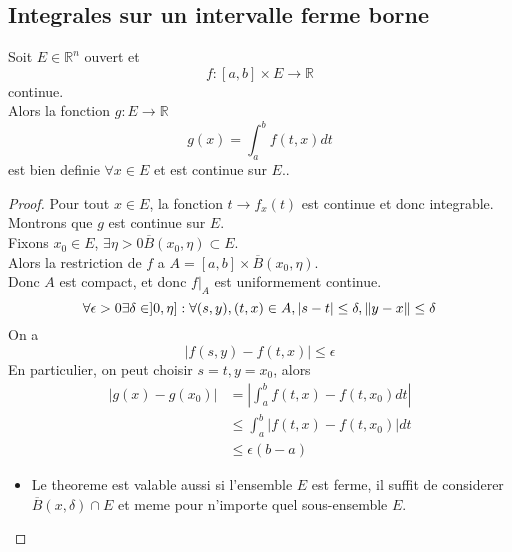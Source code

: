 \documentclass[../main.tex]{subfiles}
\begin{document}
\subsection{Integrales sur un intervalle ferme borne}
\begin{thm}
	Soit $E\in \mathbb{R}^n$ ouvert et 
	\[ 
		f:[a,b]\times E \to \mathbb{R}
	\]
continue.\\
Alors la fonction $g:E \to \mathbb{R}$ 
\[ 
	g( x) = \int_{ a }^{ b }f( t,x) dt
\]
est bien definie $\forall x \in E$ et est continue sur $E.$.\\
\end{thm}
\begin{proof}
	Pour tout $x\in E$, la fonction $t\to f_x( t) $ est continue et donc integrable.\\
	Montrons que $g$ est continue sur $E$.\\
	Fixons $x_0\in E$, $\exists \eta >0 \overline{B}( x_0,\eta) \subset E$.\\
	Alors la restriction de $f$ a $A=[a,b]\times\overline{B}( x_0,\eta) $.\\
	Donc $A$ est compact, et donc $f\vert_A$ est uniformement continue.
	\[ 
		\forall \epsilon >0 \exists \delta \in ]0,\eta]: \forall ( s,y ), ( t,x) \in A, |s-t| \leq \delta, \left\lVert y-x\right\rVert \leq \delta
	\]
On a 
\[ 
	|f( s,y) - f( t,x) | \leq \epsilon
\]
En particulier, on peut choisir $s=t, y=x_0$, alors
\begin{align*}
	| g( x) - g( x_0) | &= | \int_{ a }^{ b }f( t,x) - f( t,x_0) dt|\\
			    &\leq \int_{ a }^{ b } | f( t,x) - f( t,x_0) | dt\\
			    &\leq \epsilon( b-a) 
\end{align*}
\begin{rmq}
\begin{itemize}
	\item Le theoreme est valable aussi si l'ensemble $E$ est ferme, il suffit de considerer $\overline{B}( x,\delta) \cap E$ et meme pour n'importe quel sous-ensemble $E$.
\end{itemize}

\end{rmq}

	
\end{proof}
\end{document}
